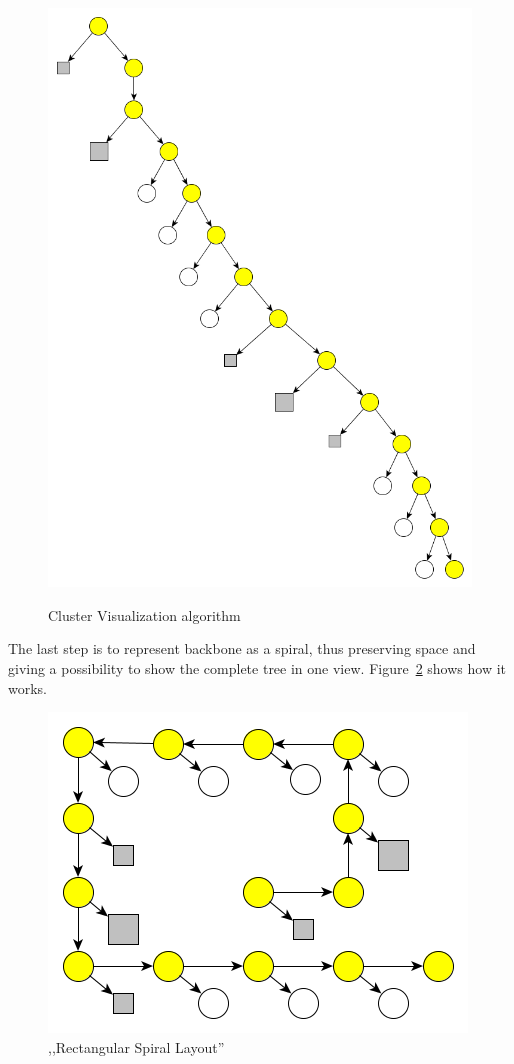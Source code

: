 \begin{figure}[h!]
{    \includegraphics[scale=0.15]{pictures/cluster_visualisation_algorithm_3.png}
    \label{fig:cluster_visualisation_algorithm_3}
}
\caption{Cluster Visualization algorithm}
\label{fig:cluster_visualisation_algorithm}
\end{figure}

The last step is to represent backbone as a spiral, thus preserving space and giving a possibility to show the complete tree in one view.
Figure~\ref{fig:cluster_visualisation_algorithm_4} shows how it works.

\begin{figure}[h!]
\centering
\includegraphics[scale=0.5]{pictures/cluster_visualisation_algorithm_4.png}
\caption{,,Rectangular Spiral Layout''}
\label{fig:cluster_visualisation_algorithm_4}
\end{figure}

